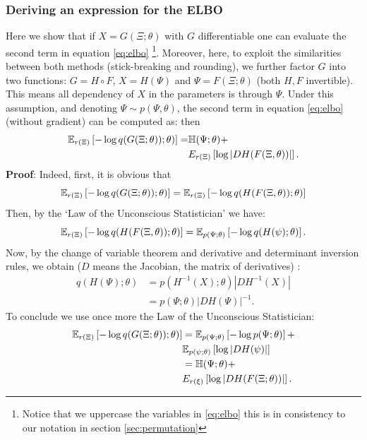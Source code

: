 \documentclass[twoside]{article}
\begin{document}
\subsubsection*{Deriving an expression for the ELBO}
Here we show that if $X=G(\Xi;\theta)$ with $G$ differentiable one can evaluate the second term in equation \eqref{eq:elbo} \footnote{Notice that we uppercase the variables in \eqref{eq:elbo} this is in consistency to our notation in section \ref{sec:permutation}}. Moreover, here, to exploit the similarities between both methods (stick-breaking and rounding), we further factor $G$ into two functions: $G=H \circ F$, $X = H(\Psi)$ and $\Psi = F(\Xi; \theta)$ (both $H,F$ invertible). This means all dependency of $X$ in the parameters is through $\Psi$. Under this assumption, and denoting $\Psi\sim p(\Psi,\theta)$, the second term in equation \eqref{eq:elbo} (without gradient) can be computed as:
 then \begin{align} \nonumber
\mathbb{E}_{r(\Xi)} \left[- \log q(G(\Xi;\theta)); \theta) \right] = & \mathbb{H}(\Psi; \theta) +\\ \nonumber & E_{r(\Xi)}\left[\log | DH(F(\Xi,\theta))|\right].\end{align}
\textbf{Proof}:
Indeed, first, it is obvious that $$\mathbb{E}_{r(\Xi)} \left[- \log q(G(\Xi;\theta)); \theta) \right] = \mathbb{E}_{r(\Xi)} \left[- \log q(H(F(\Xi,\theta)); \theta) \right] $$
Then, by the `Law of the Unconscious Statistician' we have:
 $$\mathbb{E}_{r(\Xi)} \left[- \log q(H(F(\Xi,\theta)); \theta) \right] = \mathbb{E}_{p(\Psi;\theta)} \left[- \log q(H(\psi); \theta) \right]. $$
Now, by the change of variable theorem and derivative and determinant inversion rules, we obtain ($D$ means the Jacobian, the matrix of derivatives) :\begin{align}
\nonumber q(H(\Psi); \theta) & = p(H^{-1}(X) ;\theta)  |DH ^{-1}(X) | \\ \nonumber
 & = p(\Psi; \theta) | DH (\Psi) | ^{-1}.
 \end{align}
 To conclude we use once more the Law of the Unconscious Statistician:
 \begin{eqnarray}
\nonumber \mathbb{E}_{r(\Xi)} \left[- \log q(G(\Xi;\theta)); \theta) \right]  &= \mathbb{E}_{p(\Psi;\theta)}\left[ - \log p(\Psi;\theta)\right] +   \\ & \nonumber \mathbb{E}_{p(\psi;\theta)}\left[\log | DH(\psi)|\right] \\ \label{eq:elbo2} 
 &= \mathbb{H}(\Psi; \theta)+ \\ \nonumber & E_{r(\xi)}\left[\log | DH(F(\Xi;\theta))|\right].\end{eqnarray}
 
\end{document}
